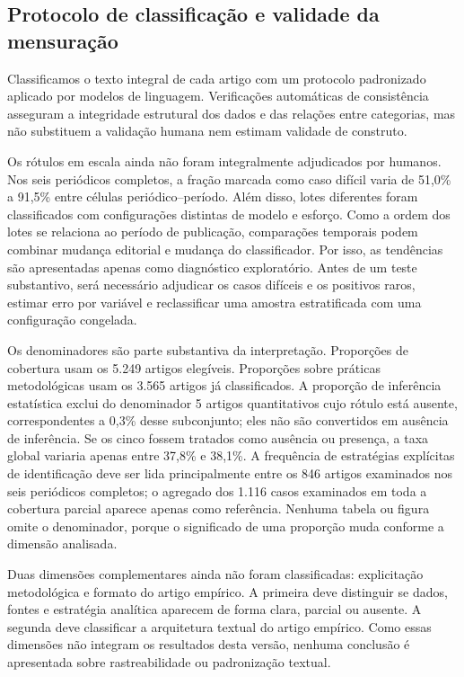 \documentclass[
]{article}
\begin{document}
\subsection{Protocolo de classificação e validade da
mensuração}\label{protocolo-de-classificauxe7uxe3o-e-validade-da-mensurauxe7uxe3o}

Classificamos o texto integral de cada artigo com um protocolo
padronizado aplicado por modelos de linguagem. Verificações automáticas
de consistência asseguram a integridade estrutural dos dados e das
relações entre categorias, mas não substituem a validação humana nem
estimam validade de construto.

Os rótulos em escala ainda não foram integralmente adjudicados por
humanos. Nos seis periódicos completos, a fração marcada como caso
difícil varia de 51,0\% a 91,5\% entre células periódico--período. Além
disso, lotes diferentes foram classificados com configurações distintas
de modelo e esforço. Como a ordem dos lotes se relaciona ao período de
publicação, comparações temporais podem combinar mudança editorial e
mudança do classificador. Por isso, as tendências são apresentadas
apenas como diagnóstico exploratório. Antes de um teste substantivo,
será necessário adjudicar os casos difíceis e os positivos raros,
estimar erro por variável e reclassificar uma amostra estratificada com
uma configuração congelada.

Os denominadores são parte substantiva da interpretação. Proporções de
cobertura usam os 5.249 artigos elegíveis. Proporções sobre práticas
metodológicas usam os 3.565 artigos já classificados. A proporção de
inferência estatística exclui do denominador 5 artigos quantitativos
cujo rótulo está ausente, correspondentes a 0,3\% desse subconjunto;
eles não são convertidos em ausência de inferência. Se os cinco fossem
tratados como ausência ou presença, a taxa global variaria apenas entre
37,8\% e 38,1\%. A frequência de estratégias explícitas de identificação
deve ser lida principalmente entre os 846 artigos examinados nos seis
periódicos completos; o agregado dos 1.116 casos examinados em toda a
cobertura parcial aparece apenas como referência. Nenhuma tabela ou
figura omite o denominador, porque o significado de uma proporção muda
conforme a dimensão analisada.

Duas dimensões complementares ainda não foram classificadas:
explicitação metodológica e formato do artigo empírico. A primeira deve
distinguir se dados, fontes e estratégia analítica aparecem de forma
clara, parcial ou ausente. A segunda deve classificar a arquitetura
textual do artigo empírico. Como essas dimensões não integram os
resultados desta versão, nenhuma conclusão é apresentada sobre
rastreabilidade ou padronização textual.
\end{document}
